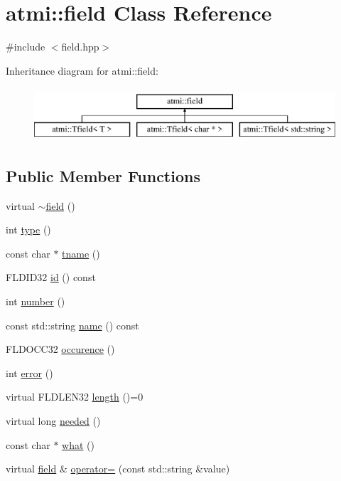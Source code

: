 \hypertarget{classatmi_1_1field}{\section{atmi\+:\+:field Class Reference}
\label{classatmi_1_1field}
}


{\ttfamily \#include $<$field.\+hpp$>$}

Inheritance diagram for atmi\+:\+:field\+:\begin{figure}[H]
\begin{center}
\leavevmode
\includegraphics[height=2.000000cm]{classatmi_1_1field}
\end{center}
\end{figure}
\subsection*{Public Member Functions}
\begin{DoxyCompactItemize}
\item 
virtual \hyperlink{classatmi_1_1field_a6f91cba3fca0a77fb7ad229187d689b9}{$\sim$field} ()
\item 
int \hyperlink{classatmi_1_1field_a717c701f07a784f471abb44d7bc95048}{type} ()
\item 
const char $\ast$ \hyperlink{classatmi_1_1field_a7d6260dd6f7c3c44de29190c2dfd546e}{tname} ()
\item 
F\+L\+D\+I\+D32 \hyperlink{classatmi_1_1field_a89ff294c8276c6a882f510a8f95ac372}{id} () const 
\item 
int \hyperlink{classatmi_1_1field_aa71d28f3df8490e9ed016607f857fae1}{number} ()
\item 
const std\+::string \hyperlink{classatmi_1_1field_a94aab112ec52966a2a772d219e87a965}{name} () const 
\item 
F\+L\+D\+O\+C\+C32 \hyperlink{classatmi_1_1field_a161b9b7037c49fbcf86518fcb35e779c}{occurence} ()
\item 
int \hyperlink{classatmi_1_1field_a6d8db988f58f3779b0ef528a11b3466f}{error} ()
\item 
virtual F\+L\+D\+L\+E\+N32 \hyperlink{classatmi_1_1field_a296771293135085d91aa9aefd108d44d}{length} ()=0
\item 
virtual long \hyperlink{classatmi_1_1field_aef2940ef13d554b2a0090ea4052529d8}{needed} ()
\item 
const char $\ast$ \hyperlink{classatmi_1_1field_a396b41ad5ae2b1df362e446c5f090640}{what} ()
\item 
virtual \hyperlink{classatmi_1_1field}{field} \& \hyperlink{classatmi_1_1field_addd031ecbcf2026116cf6e03534ac862}{operator=} (const std\+::string \&value)
\end{DoxyCompactItemize}
